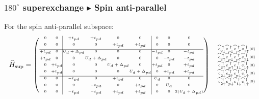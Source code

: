 \documentclass{beamer}
\begin{document}
  \begin{frame}
    \frametitle{\(180^{\circ}\) superexchange \(\blacktriangleright\) Spin anti-parallel}\footnotesize
    For the spin anti-parallel subspace:
    \begin{equation}\arraycolsep=0.2pt
      \widehat{H}_{\text{sup}} = \begin{pmatrix}\tiny\begin{array}{cc|cccc|ccc}
        0 & 0 & +t_{pd} & +t_{pd} & 0 & 0 & 0 & 0 & 0\\[0.5em]
        0 & 0 & 0 & 0 & +t_{pd} & +t_{pd} &0 & 0 & 0 \\[0.5em]\hline
        +t_{pd} & 0 & U_d+\Delta_{pd} & 0 & 0 & 0 & -t_{pd} & 0 & -t_{pd}\\[0.5em]
        +t_{pd} & 0 & 0 & U_d+\Delta_{pd} & 0 & 0 & 0 & -t_{pd} & -t_{pd}\\[0.5em]
        0 & +t_{pd} & 0 & 0 & U_d+\Delta_{pd} & 0 & +t_{pd} & 0 & +t_{pd}\\[0.5em]
        0 & +t_{pd} & 0 & 0 & 0 & U_d+\Delta_{pd} & 0 & +t_{pd} & +t_{pd}\\[0.5em]\hline
        0 & 0 & -t_{pd} & 0 & +t_{pd} & 0 & U_d & 0 & 0\\[0.5em]
        0 & 0 & 0 & -t_{pd} & 0 & +t_{pd} & 0 & U_d & 0\\[0.5em]
        0 & 0 & -t_{pd} & -t_{pd} & +t_{pd} & +t_{pd} & 0 & 0 & 2(U_d+\Delta_{pd})
      \end{array}\end{pmatrix}\ \ \ \begin{matrix}\tiny\begin{array}{c}
        \widehat{c}_{2\downarrow}^{\;\dagger}\widehat{c}_{p\downarrow}^{\;\dagger}\widehat{c}_{p\uparrow}^{\;\dagger}\widehat{c}_{1\uparrow}^{\;\dagger}|0\rangle\\
        \widehat{c}_{2\uparrow}^{\;\dagger}\widehat{c}_{p\downarrow}^{\;\dagger}\widehat{c}_{p\uparrow}^{\;\dagger}\widehat{c}_{1\downarrow}^{\;\dagger}|0\rangle\\
        \widehat{c}_{2\uparrow}^{\;\dagger}\widehat{c}_{p\uparrow}^{\;\dagger}\widehat{c}_{1\downarrow}^{\;\dagger}\widehat{c}_{1\uparrow}^{\;\dagger}|0\rangle\\
        \widehat{c}_{2\downarrow}^{\;\dagger}\widehat{c}_{2\uparrow}^{\;\dagger}\widehat{c}_{p\downarrow}^{\;\dagger}\widehat{c}_{1\uparrow}^{\;\dagger}|0\rangle\\
        \widehat{c}_{2\uparrow}^{\;\dagger}\widehat{c}_{p\downarrow}^{\;\dagger}\widehat{c}_{1\downarrow}^{\;\dagger}\widehat{c}_{1\uparrow}^{\;\dagger}|0\rangle\\

\end{array}
\end{matrix}
\end{equation}
\end{frame}
\end{document}
